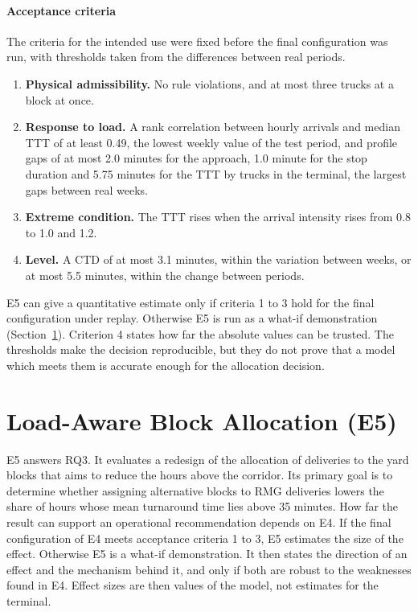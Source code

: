 \paragraph{Acceptance criteria} The criteria for the intended use were fixed before
the final configuration was run, with thresholds taken from the differences between
real periods.
\begin{enumerate}
\item \textbf{Physical admissibility.} No rule violations, and at most three trucks
at a block at once.
\item \textbf{Response to load.} A rank correlation between hourly arrivals and
median TTT of at least 0.49, the lowest weekly value of the test period, and profile
gaps of at most 2.0 minutes for the approach, 1.0 minute for the stop duration and
5.75 minutes for the TTT by trucks in the terminal, the largest gaps between real
weeks.
\item \textbf{Extreme condition.} The TTT rises when the arrival intensity rises from
0.8 to 1.0 and 1.2.
\item \textbf{Level.} A CTD of at most 3.1 minutes, within the variation between
weeks, or at most 5.5 minutes, within the change between periods.
\end{enumerate}
E5 can give a quantitative estimate only if criteria 1 to 3 hold for the final
configuration under replay. Otherwise E5 is run as a what-if demonstration
(Section~\ref{sec:exp_policy}). Criterion 4 states how far the absolute values can
be trusted. The thresholds make the decision reproducible, but they do not prove that
a model which meets them is accurate enough for the allocation decision.

\section{Load-Aware Block Allocation (E5)}
\label{sec:exp_policy}

E5 answers RQ3. It evaluates a redesign of the allocation of deliveries to the yard
blocks that aims to reduce the hours above the corridor. Its primary goal is to
determine whether assigning alternative blocks to RMG deliveries lowers the share of
hours whose mean turnaround time lies above 35 minutes. How far the result can
support an operational recommendation depends on E4. If the final configuration of
E4 meets acceptance criteria 1 to 3, E5 estimates the size of the effect. Otherwise
E5 is a what-if demonstration. It then states the direction of an effect and the
mechanism behind it, and only if both are robust to the weaknesses found in E4.
Effect sizes are then values of the model, not estimates for the terminal.

